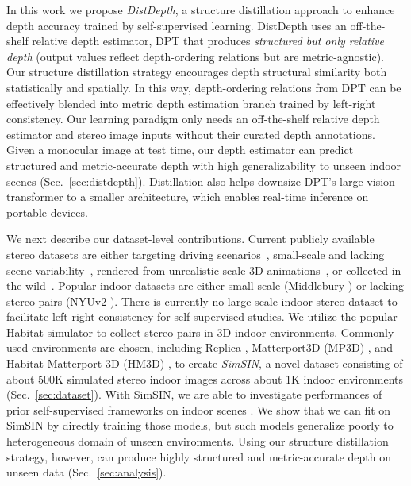 \documentclass[10pt,twocolumn,letterpaper]{article}
\begin{document}
In this work we propose \textit{DistDepth}, a structure distillation approach to enhance depth accuracy trained by self-supervised learning. DistDepth uses an off-the-shelf relative depth estimator, DPT \cite{Ranftl2020, Ranftl2021} that produces \textit{structured but only relative depth} (output values reflect depth-ordering relations but are metric-agnostic). Our structure distillation strategy encourages depth structural similarity both statistically and spatially. In this way,  depth-ordering relations from DPT can be effectively blended into metric depth estimation branch trained by left-right consistency. Our learning paradigm only needs an off-the-shelf relative depth estimator and stereo image inputs without their curated depth annotations. Given a monocular image at test time, our depth estimator can predict structured and metric-accurate depth with high generalizability to unseen indoor scenes (Sec.~\ref{sec:distdepth}). Distillation also helps downsize DPT's large vision transformer to a smaller architecture, which enables real-time inference on portable devices.

We next describe our dataset-level contributions. Current publicly available stereo datasets are either targeting driving scenarios~\cite{geiger2012we, Gaidon:Virtual:CVPR2016, Cordts2016Cityscapes, Argoverse, wilson2021argoverse}, small-scale and lacking scene variability~\cite{scharstein2014high, schops2019bad}, rendered from unrealistic-scale 3D animations~\cite{mayer2016large, Butler2012}, or collected in-the-wild~\cite{wang2019web, hua2020holopix50k}.
Popular indoor datasets are either small-scale (Middlebury \cite{scharstein2014high}) or lacking stereo pairs (NYUv2 \cite{SilbermanECCV12}). There is currently no large-scale indoor stereo dataset to facilitate left-right consistency for self-supervised studies. We utilize the popular Habitat simulator \cite{savva2019habitat, szot2021habitat} to collect stereo pairs in 3D indoor environments. Commonly-used environments are chosen, including Replica \cite{straub2019replica}, Matterport3D (MP3D) \cite{chang2017matterport3d}, and Habitat-Matterport 3D (HM3D) \cite{ramakrishnan2021habitat}, to create \textit{SimSIN}, a novel dataset consisting of about 500K simulated stereo indoor images across about 1K indoor environments (Sec.~\ref{sec:dataset}). With SimSIN, we are able to investigate performances of prior self-supervised frameworks on indoor scenes \cite{Godard_2019_ICCV, watson2019self, watson2021temporal}. We show that we can fit on SimSIN by directly training those models, but such models generalize poorly to heterogeneous domain of unseen environments. Using our structure distillation strategy, however, can produce highly structured and metric-accurate depth on unseen data (Sec.~\ref{sec:analysis}).
\end{document}
